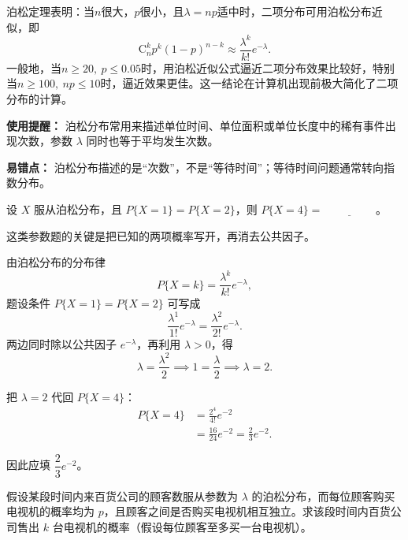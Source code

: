 ﻿\documentclass[lang=cn,11pt]{elegantbook}
\begin{document}
\begin{note}
泊松定理表明：当$n$很大，$p$很小，且$\lambda = np$适中时，二项分布可用泊松分布近似，即
\[
\mathrm{C}_n^k p^k (1-p)^{n-k} \approx \frac{\lambda^k}{k!} e^{-\lambda}.
\]
一般地，当$n \ge 20,\ p \le 0.05$时，用泊松近似公式逼近二项分布效果比较好，特别当$n \ge 100,\ np \le 10$时，逼近效果更佳。这一结论在计算机出现前极大简化了二项分布的计算。

\textbf{使用提醒：} 泊松分布常用来描述单位时间、单位面积或单位长度中的稀有事件出现次数，参数 \(\lambda\) 同时也等于平均发生次数。

\textbf{易错点：} 泊松分布描述的是“次数”，不是“等待时间”；等待时间问题通常转向指数分布。
\end{note}

\begin{exercise}\label{exer:2-9}
设 $X$ 服从泊松分布，且 $P\{X=1\} = P\{X=2\}$，则 $P\{X=4\} = \underline{\hspace{2cm}}$。
\end{exercise}

\begin{solution}
这类参数题的关键是把已知的两项概率写开，再消去公共因子。

由泊松分布的分布律
\[
P\{X=k\}=\frac{\lambda^k}{k!}e^{-\lambda},
\]
题设条件 \(P\{X=1\}=P\{X=2\}\) 可写成
\[
\frac{\lambda^1}{1!}e^{-\lambda}=\frac{\lambda^2}{2!}e^{-\lambda}.
\]
两边同时除以公共因子 \(e^{-\lambda}\)，再利用 \(\lambda>0\)，得
\[
\lambda=\frac{\lambda^2}{2}\implies 1=\frac{\lambda}{2}\implies \lambda=2.
\]

把 \(\lambda=2\) 代回 \(P\{X=4\}\)：
\[
\begin{aligned}
P\{X=4\}
&=\frac{2^4}{4!}e^{-2}\\
&=\frac{16}{24}e^{-2}
=\frac{2}{3}e^{-2}.
\end{aligned}
\]

因此应填 \(\dfrac{2}{3}e^{-2}\)。
\end{solution}

\begin{exercise}[泊松分布]\label{exer:2-27}
假设某段时间内来百货公司的顾客数服从参数为 $\lambda$ 的泊松分布，而每位顾客购买电视机的概率均为 $p$，且顾客之间是否购买电视机相互独立。求该段时间内百货公司售出 $k$ 台电视机的概率（假设每位顾客至多买一台电视机）。
\end{exercise}
\end{document}
